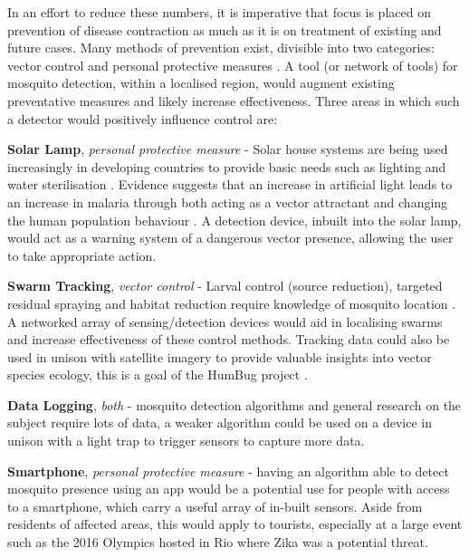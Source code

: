         In an effort to reduce these numbers, it is imperative that focus is placed on prevention of disease contraction as much as it is on treatment of existing and future cases. Many methods of prevention exist, divisible into two categories: vector control and personal protective measures \cite{Caraballo2014}. A tool (or network of tools) for mosquito detection, within a localised region, would augment existing preventative measures and likely increase effectiveness. Three areas in which such a detector would positively influence control are:
        \begin{sitemize}
            \item{\textbf{Solar Lamp}, \textit{personal protective measure} - Solar house systems are being used increasingly in developing countries to provide basic needs such as lighting and water sterilisation \cite{Akikur2013}. Evidence suggests that an increase in artificial light leads to an increase in malaria through both acting as a vector attractant and changing the human population behaviour \cite{Barghini2010}. A detection device, inbuilt into the solar lamp, would act as a warning system of a dangerous vector presence, allowing the user to take appropriate action.}
            \item{\textbf{Swarm Tracking}, \textit{vector control} - Larval control (source reduction), targeted residual spraying and habitat reduction require knowledge of mosquito location \cite{Caraballo2014,Pates2005,WHOVectorControl2016}. A networked array of sensing/detection devices would aid in localising swarms and increase effectiveness of these control methods. Tracking data could also be used in unison with satellite imagery to provide valuable insights into vector species ecology, this is a goal of the HumBug project \cite{HumBug2016}.}
            \item{\textbf{Data Logging}, \textit{both} - mosquito detection algorithms and general research on the subject require lots of data, a weaker algorithm could be used on a device in unison with a light trap to trigger sensors to capture more data.}
            \item{\textbf{Smartphone}, \textit{personal protective measure} - having an algorithm able to detect mosquito presence using an app would be a potential use for people with access to a smartphone, which carry a useful array of in-built sensors. Aside from residents of affected areas, this would apply to tourists, especially at a large event such as the 2016 Olympics hosted in Rio where Zika was a potential threat.}
        \end{sitemize}
